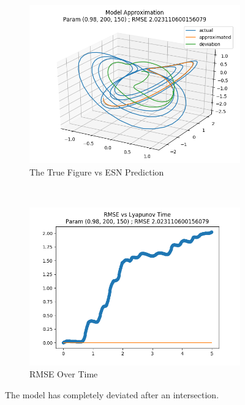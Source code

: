 \documentclass{article}
\begin{document}
\begin{figure}[H]
    \centering
    \begin{subfigure}[b]{0.45\textwidth}
        \includegraphics[width=\textwidth]{doc/paper/images/lorenz/rank_2_param_458_fit.png}
        \caption{The True Figure vs ESN Prediction}
        \label{fig:lorenz_r2_fit}
    \end{subfigure}
    ~
    \begin{subfigure}[b]{0.45\textwidth}
        \includegraphics[width=\textwidth]{doc/paper/images/lorenz/rank_2_param_458_rmse.png}
        \caption{RMSE Over Time}
        \label{fig:lorenz_r2_rmse}
    \end{subfigure}
    \caption{The model has completely deviated after an intersection.}
    \label{fig:lorenz_r2}
\end{figure}
\end{document}
